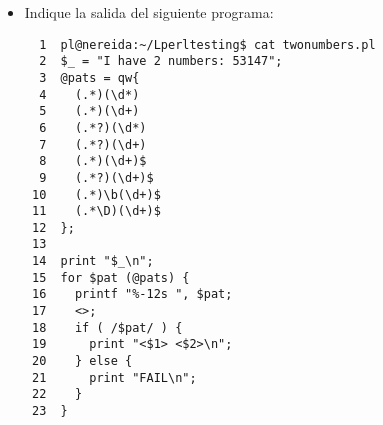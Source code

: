 
\begin{exercise}
\begin{itemize}
\item
Indique la salida del siguiente programa:
\begin{latexonly}
\begin{verbatim}
  1  pl@nereida:~/Lperltesting$ cat twonumbers.pl
  2  $_ = "I have 2 numbers: 53147";
  3  @pats = qw{
  4    (.*)(\d*)
  5    (.*)(\d+)
  6    (.*?)(\d*)
  7    (.*?)(\d+)
  8    (.*)(\d+)$
  9    (.*?)(\d+)$
 10    (.*)\b(\d+)$
 11    (.*\D)(\d+)$
 12  };
 13  
 14  print "$_\n";
 15  for $pat (@pats) {
 16    printf "%-12s ", $pat;
 17    <>;
 18    if ( /$pat/ ) {
 19      print "<$1> <$2>\n";
 20    } else {
 21      print "FAIL\n";
 22    }
 23  }
\end{verbatim}
\end{latexonly}
\begin{verbatim}


\end{verbatim}
\end{itemize}
\end{exercise}
